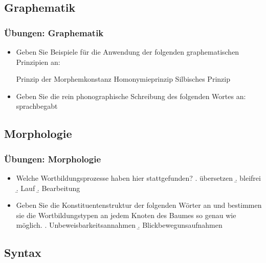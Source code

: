 \subsection{Graphematik}

\begin{frame}
\frametitle{Übungen: Graphematik}

\begin{itemize}
	\item Geben Sie Beispiele für die Anwendung der folgenden graphematischen Prinzipien an:
	
	\eal 
	\ex Prinzip der Morphemkonstanz
	\ex Homonymieprinzip
	\ex Silbisches Prinzip
	\zl
	
	\item Geben Sie die rein phonographische Schreibung des folgenden Wortes an:
	\ea sprachbegabt
	\z
	
	
\end{itemize}

\end{frame}

\subsection{Morphologie}

\begin{frame}
\frametitle{Übungen: Morphologie}

\begin{itemize}
	\item Welche Wortbildungsprozesse haben hier stattgefunden?
	\a. übersetzen
	\b. bleifrei
	\b. Lauf
	\b. Bearbeitung

	\item Geben Sie die Konstituentenstruktur der folgenden Wörter an und bestimmen sie die Wortbildungstypen an jedem Knoten des Baumes so genau wie möglich.
	\a. Unbeweisbarkeitsannahmen
	\b. Blickbewegunsaufnahmen
	
\end{itemize}

\end{frame}


\subsection{Syntax}

